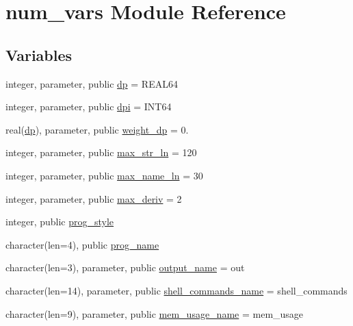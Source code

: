 \hypertarget{namespacenum__vars}{}\section{num\+\_\+vars Module Reference}
\label{namespacenum__vars}
\subsection*{Variables}
\begin{DoxyCompactItemize}
\item 
integer, parameter, public \hyperlink{namespacenum__vars_a03802aa2bd86439d7a9370836fabf3f2}{dp} = R\+E\+A\+L64
\item 
integer, parameter, public \hyperlink{namespacenum__vars_a7e4915cb055749f1170afaa77b055cd5}{dpi} = I\+N\+T64
\item 
real(\hyperlink{namespacenum__vars_a03802aa2bd86439d7a9370836fabf3f2}{dp}), parameter, public \hyperlink{namespacenum__vars_ad5be06791ebf0ca75fc6dc7339916ae8}{weight\+\_\+dp} = 0.
\item 
integer, parameter, public \hyperlink{namespacenum__vars_a3ff2bb983ee80a6735277d6789e6ce7c}{max\+\_\+str\+\_\+ln} = 120
\item 
integer, parameter, public \hyperlink{namespacenum__vars_a1b79c43315241705b429443dfe798837}{max\+\_\+name\+\_\+ln} = 30
\item 
integer, parameter, public \hyperlink{namespacenum__vars_a78f5aeea9d9c2f41e388bfcef9021e64}{max\+\_\+deriv} = 2
\item 
integer, public \hyperlink{namespacenum__vars_a50245a345efb453eda46b3fe98b702e8}{prog\+\_\+style}
\item 
character(len=4), public \hyperlink{namespacenum__vars_a7548fedc0d8f3102844aded2e6c11f82}{prog\+\_\+name}
\item 
character(len=3), parameter, public \hyperlink{namespacenum__vars_a0fbc4b8f8965e85d6cb1b1f7894ab698}{output\+\_\+name} = \textquotesingle{}out\textquotesingle{}
\item 
character(len=14), parameter, public \hyperlink{namespacenum__vars_af30710083de41ebf93a407412d3125e5}{shell\+\_\+commands\+\_\+name} = \textquotesingle{}shell\+\_\+commands\textquotesingle{}
\item 
character(len=9), parameter, public \hyperlink{namespacenum__vars_a88d78503df095a1c19b851caf2d889ba}{mem\+\_\+usage\+\_\+name} = \textquotesingle{}mem\+\_\+usage\textquotesingle{}
\item 

\end{DoxyCompactItemize}

